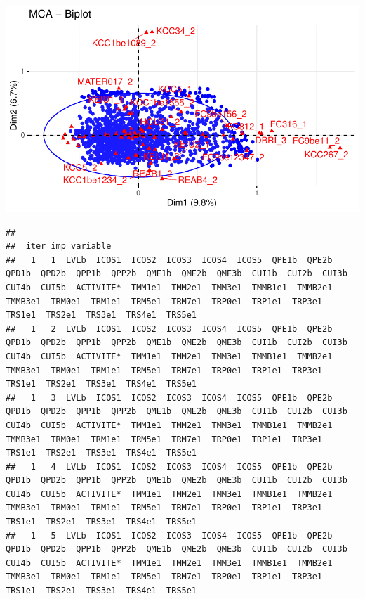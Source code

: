 \documentclass[11pt,a4paper, x11names]{article}\usepackage[]{graphicx}\usepackage[]{color}
\makeatletter
\def\maxwidth{ %
  \ifdim\Gin@nat@width>\linewidth
    \linewidth
  \else
    \Gin@nat@width
  \fi
}
\newenvironment{kframe}{%
 \def\at@end@of@kframe{}%
 \ifinner\ifhmode%
  \def\at@end@of@kframe{\end{minipage}}%
  \begin{minipage}{\columnwidth}%
 \fi\fi%
 \def\FrameCommand##1{\hskip\@totalleftmargin \hskip-\fboxsep
 \colorbox{shadecolor}{##1}\hskip-\fboxsep
     \hskip-\linewidth \hskip-\@totalleftmargin \hskip\columnwidth}%
 \MakeFramed {\advance\hsize-\width
   \@totalleftmargin\z@ \linewidth\hsize
   \@setminipage}}%
 {\par\unskip\endMakeFramed%
 \at@end@of@kframe}
\newenvironment{knitrout}{}{} %
\makeatother
\begin{document}
\begin{knitrout}
\color{fgcolor}
\includegraphics[width=\maxwidth]{figure/unnamed-chunk-12-1} 
\begin{kframe}\begin{verbatim}
## 
##  iter imp variable
##   1   1  LVLb  ICOS1  ICOS2  ICOS3  ICOS4  ICOS5  QPE1b  QPE2b  QPD1b  QPD2b  QPP1b  QPP2b  QME1b  QME2b  QME3b  CUI1b  CUI2b  CUI3b  CUI4b  CUI5b  ACTIVITE*  TMM1e1  TMM2e1  TMM3e1  TMMB1e1  TMMB2e1  TMMB3e1  TRM0e1  TRM1e1  TRM5e1  TRM7e1  TRP0e1  TRP1e1  TRP3e1  TRS1e1  TRS2e1  TRS3e1  TRS4e1  TRS5e1
##   1   2  LVLb  ICOS1  ICOS2  ICOS3  ICOS4  ICOS5  QPE1b  QPE2b  QPD1b  QPD2b  QPP1b  QPP2b  QME1b  QME2b  QME3b  CUI1b  CUI2b  CUI3b  CUI4b  CUI5b  ACTIVITE*  TMM1e1  TMM2e1  TMM3e1  TMMB1e1  TMMB2e1  TMMB3e1  TRM0e1  TRM1e1  TRM5e1  TRM7e1  TRP0e1  TRP1e1  TRP3e1  TRS1e1  TRS2e1  TRS3e1  TRS4e1  TRS5e1
##   1   3  LVLb  ICOS1  ICOS2  ICOS3  ICOS4  ICOS5  QPE1b  QPE2b  QPD1b  QPD2b  QPP1b  QPP2b  QME1b  QME2b  QME3b  CUI1b  CUI2b  CUI3b  CUI4b  CUI5b  ACTIVITE*  TMM1e1  TMM2e1  TMM3e1  TMMB1e1  TMMB2e1  TMMB3e1  TRM0e1  TRM1e1  TRM5e1  TRM7e1  TRP0e1  TRP1e1  TRP3e1  TRS1e1  TRS2e1  TRS3e1  TRS4e1  TRS5e1
##   1   4  LVLb  ICOS1  ICOS2  ICOS3  ICOS4  ICOS5  QPE1b  QPE2b  QPD1b  QPD2b  QPP1b  QPP2b  QME1b  QME2b  QME3b  CUI1b  CUI2b  CUI3b  CUI4b  CUI5b  ACTIVITE*  TMM1e1  TMM2e1  TMM3e1  TMMB1e1  TMMB2e1  TMMB3e1  TRM0e1  TRM1e1  TRM5e1  TRM7e1  TRP0e1  TRP1e1  TRP3e1  TRS1e1  TRS2e1  TRS3e1  TRS4e1  TRS5e1
##   1   5  LVLb  ICOS1  ICOS2  ICOS3  ICOS4  ICOS5  QPE1b  QPE2b  QPD1b  QPD2b  QPP1b  QPP2b  QME1b  QME2b  QME3b  CUI1b  CUI2b  CUI3b  CUI4b  CUI5b  ACTIVITE*  TMM1e1  TMM2e1  TMM3e1  TMMB1e1  TMMB2e1  TMMB3e1  TRM0e1  TRM1e1  TRM5e1  TRM7e1  TRP0e1  TRP1e1  TRP3e1  TRS1e1  TRS2e1  TRS3e1  TRS4e1  TRS5e1

\end{verbatim}
\end{kframe}
\end{knitrout}
\end{document}
